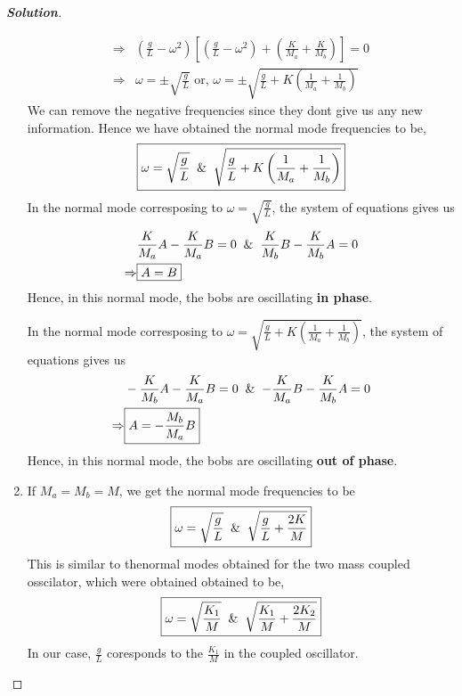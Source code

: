 \documentclass[10pt]{scrartcl}
\theoremstyle{definition}
\newenvironment{solution} {\begin{proof}[\normalfont \textbf{Solution}]} {\end{proof}}
\begin{document}
\begin{solution}
\begin{enumerate}[label={(\alph*)}]
\begin{align*}
                \Rightarrow &\left(\frac{g}{L} - \omega^2\right)\left[\left(\frac{g}{L} - \omega^2\right)+\left(\frac{K}{M_a} + \frac{K}{M_b}\right)\right] = 0 \\
                \Rightarrow & \omega = \pm \sqrt{\frac{g}{L}} \text{ or, } \omega = \pm \sqrt{\frac{g}{L} + K \left(\frac{1}{M_a} + \frac{1}{M_b}\right)}
            \end{align*}
            We can remove the negative frequencies since they dont give us any new information. Hence we have obtained the normal mode frequencies to be, 
            $$\boxed{\omega =  \sqrt{\frac{g}{L}} \And \sqrt{\frac{g}{L} + K \left(\frac{1}{M_a} + \frac{1}{M_b}\right)}}$$
            In the normal mode corresposing to $\omega = \sqrt{\frac{g}{L}}$, the system of equations gives us
            \begin{align*}
                &\frac{K}{M_a}A - \frac{K}{M_a}B = 0 \And \frac{K}{M_b}B - \frac{K}{M_b}A = 0\\ 
                \Rightarrow &\boxed{A = B}
            \end{align*}
            Hence, in this normal mode, the bobs are oscillating \textbf{in phase}.

            In the normal mode corresposing to $\omega = \sqrt{\frac{g}{L} + K\left(\frac{1}{M_a} + \frac{1}{M_b}\right)}$, the system of equations gives us
            \begin{align*}
                &-\frac{K}{M_b}A - \frac{K}{M_a}B = 0 \And -\frac{K}{M_a}B - \frac{K}{M_b}A = 0\\ 
                \Rightarrow &\boxed{A = -\frac{M_b}{M_a}B}
            \end{align*}
            Hence, in this normal mode, the bobs are oscillating \textbf{out of phase}.
        \item If $M_a = M_b = M$, we get the normal mode frequencies to be
            $$\boxed{\omega =  \sqrt{\frac{g}{L}} \And \sqrt{\frac{g}{L} + \frac{2K}{M}}}$$
            This is similar to thenormal modes obtained for the two mass  coupled osscilator, which were obtained obtained to be, 
            $$\boxed{\omega =  \sqrt{\frac{K_1}{M}} \And \sqrt{\frac{K_1}{M} + \frac{2K_2}{M}}}$$
            In our case, $\frac{g}{L}$ coresponds to the $\frac{K_1}{M}$ in the coupled oscillator.
    \end{enumerate}
\end{solution}
\end{document}

